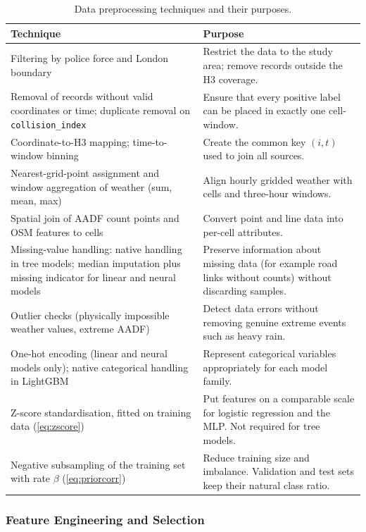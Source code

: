 \begin{table}[t]
\centering
\caption{Data preprocessing techniques and their purposes.}
\label{tab:preprocessing}
\footnotesize
\begin{tabularx}{\textwidth}{L{4.2cm} Y}
\toprule
\textbf{Technique} & \textbf{Purpose} \\
\midrule
Filtering by police force and London boundary & Restrict the data to the study area; remove records outside the H3 coverage. \\
Removal of records without valid coordinates or time; duplicate removal on \texttt{collision\_index} & Ensure that every positive label can be placed in exactly one cell-window. \\
Coordinate-to-H3 mapping; time-to-window binning & Create the common key $(i,t)$ used to join all sources. \\
Nearest-grid-point assignment and window aggregation of weather (sum, mean, max) & Align hourly gridded weather with cells and three-hour windows. \\
Spatial join of AADF count points and OSM features to cells & Convert point and line data into per-cell attributes. \\
Missing-value handling: native handling in tree models; median imputation plus missing indicator for linear and neural models & Preserve information about missing data (for example road links without counts) without discarding samples. \\
Outlier checks (physically impossible weather values, extreme AADF) & Detect data errors without removing genuine extreme events such as heavy rain. \\
One-hot encoding (linear and neural models only); native categorical handling in LightGBM & Represent categorical variables appropriately for each model family. \\
Z-score standardisation, fitted on training data (\cref{eq:zscore}) & Put features on a comparable scale for logistic regression and the MLP. Not required for tree models. \\
Negative subsampling of the training set with rate $\beta$ (\cref{eq:priorcorr}) & Reduce training size and imbalance. Validation and test sets keep their natural class ratio. \\
\bottomrule
\end{tabularx}
\end{table}

\subsubsection{Feature Engineering and Selection}
\label{sec:features}

